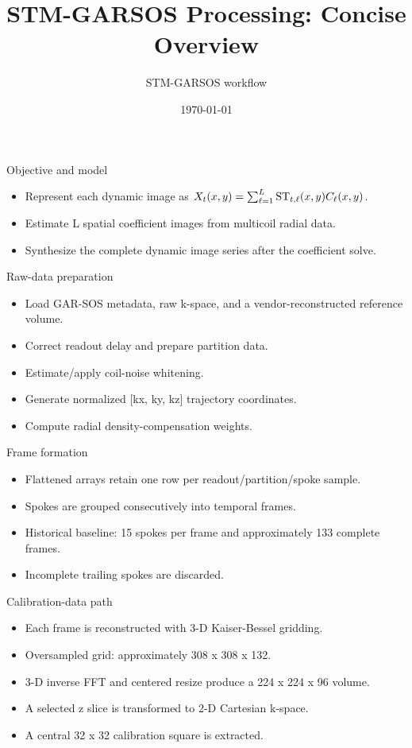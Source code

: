 \documentclass[aspectratio=169,professionalfonts]{beamer}
\title{STM-GARSOS Processing: Concise Overview}
\author{STM-GARSOS workflow}
\date{\today}
\begin{document}
\begin{frame}\titlepage\end{frame}
\begin{frame}{Objective and model}
\begin{itemize}
\item Represent each dynamic image as $X_t(x,y)=\sum_{\ell=1}^{L} {\rm ST}_{t,\ell}(x,y) C_\ell(x,y)$.
\item Estimate L spatial coefficient images from multicoil radial data.
\item Synthesize the complete dynamic image series after the coefficient solve.
\end{itemize}
\end{frame}
\begin{frame}{Raw-data preparation}
\begin{itemize}
\item Load GAR-SOS metadata, raw k-space, and a vendor-reconstructed reference volume.
\item Correct readout delay and prepare partition data.
\item Estimate/apply coil-noise whitening.
\item Generate normalized [kx, ky, kz] trajectory coordinates.
\item Compute radial density-compensation weights.
\end{itemize}
\end{frame}
\begin{frame}{Frame formation}
\begin{itemize}
\item Flattened arrays retain one row per readout/partition/spoke sample.
\item Spokes are grouped consecutively into temporal frames.
\item Historical baseline: 15 spokes per frame and approximately 133 complete frames.
\item Incomplete trailing spokes are discarded.
\end{itemize}
\end{frame}
\begin{frame}{Calibration-data path}
\begin{itemize}
\item Each frame is reconstructed with 3-D Kaiser-Bessel gridding.
\item Oversampled grid: approximately 308 x 308 x 132.
\item 3-D inverse FFT and centered resize produce a 224 x 224 x 96 volume.
\item A selected z slice is transformed to 2-D Cartesian k-space.
\item A central 32 x 32 calibration square is extracted.
\end{itemize}
\end{frame}
\end{document}
